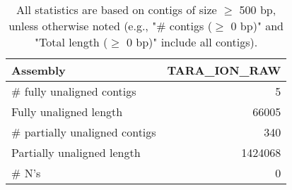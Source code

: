 \documentclass[12pt,a4paper]{article}
\begin{document}
\begin{table}[ht]
\begin{center}
\caption{All statistics are based on contigs of size $\geq$ 500 bp, unless otherwise noted (e.g., "\# contigs ($\geq$ 0 bp)" and "Total length ($\geq$ 0 bp)" include all contigs).}
\begin{tabular}{|l*{1}{|r}|}
\hline
Assembly & TARA\_ION\_RAW \\ \hline
\# fully unaligned contigs & 5 \\ \hline
Fully unaligned length & 66005 \\ \hline
\# partially unaligned contigs & 340 \\ \hline
Partially unaligned length & 1424068 \\ \hline
\# N's & 0 \\ \hline
\end{tabular}
\end{center}
\end{table}
\end{document}
